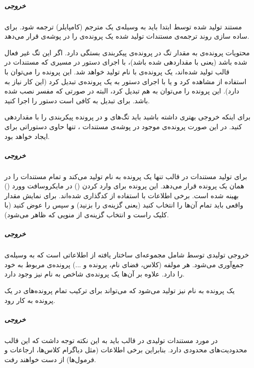 \subparagraph{خروجی }

مستند  تولید شده توسط  ابتدا باید به وسیله‌ی یک مترجم
(کامپایلر)  ترجمه شود.  برای ساده سازی روند ترجمه‌ی
مستندات تولید شده یک پرونده‌ی  را در پوشه‌ی  قرار می‌دهد.

محتویات پرونده‌ی  به مقدار تگ  در پرونده‌ی
پیکربندی بستگی دارد. اگر این تگ غیر فعال شده باشد (یعنی با  مقداردهی شده
باشد)، با اجرای دستور  در مسیری که مستندات در
 قالب  تولید شده‌اند، یک پرونده‌ی  با نام 
 تولید خواهد شد. این پرونده را می‌توان با
استفاده از  مشاهده کرد و یا با اجرای دستور  به یک پرونده‌ی
 تبدیل کرد (این کار نیاز به  دارد). این پرونده را
می‌توان به  هم تبدیل کرد، البته در صورتی که مفسر  نصب
شده باشد. برای تبدیل به  کافی است دستور  را اجرا کنید.

برای اینکه خروجی  بهتری داشته باشید باید تگ‌های  و
 در پرونده پیکربندی را با  مقداردهی کنید. در این صورت
پرونده‌ی  موجود در پوشه‌ی مستندات ، تنها حاوی دستوراتی
برای ایجاد  خواهد بود.

\subparagraph{خروجی }

برای تولید مستندات در قالب  تنها یک پرونده به نام  تولید
می‌کند و تمام مستندات را در همان یک پرونده قرار می‌دهد. این پرونده برای وارد
کردن () در مایکروسافت وورد () بهینه شده است.
برخی اطلاعات با استفاده از  کدگذاری شده‌اند. برای نمایش مقدار واقعی
باید تمام آن‌ها را انتخاب کنید (یعنی گزینه‌ی  را بزنید) و
سپس  را عوض کنید (با کلیک راست و انتخاب گزینه‌ی  از منویی
که ظاهر می‌شود).

\subparagraph{ خروجی  }

خروجی  تولیدی توسط  شامل مجموعه‌ای ساختار یافته از اطلاعاتی
است که به وسیله‌ی  جمع‌آوری می‌شود.
هر مولفه (کلاس، فضای نام، پرونده و ...) پرونده‌ی  مربوط به خود را دارد.
علاوه بر آن‌ها یک پرونده‌ی شاخص به نام  نیز وجود دارد.
 
یک پرونده به نام  نیز تولید می‌شود که می‌تواند برای ترکیب تمام
پرونده‌های  در یک پرونده به کار رود.

\subparagraph{خروجی }

در مورد مستندات تولیدی در قالب  باید به این نکته توجه داشت که این
قالب محدودیت‌های محدودی دارد. بنابراین برخی اطلاعات (مثل دیاگرام کلاس‌ها،
ارجاعات و فرمول‌ها) از دست خواهند رفت.
